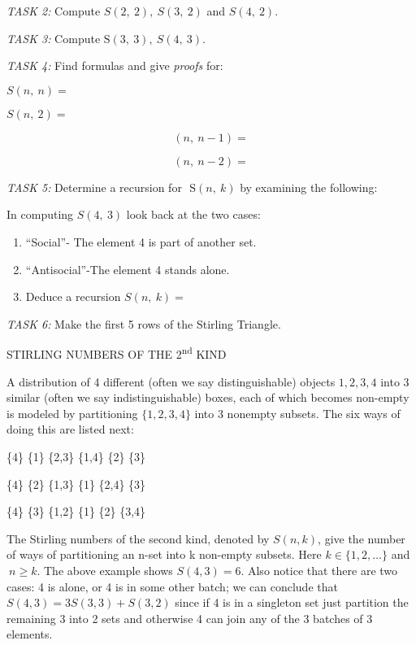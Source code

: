 \emph{TASK 2:} Compute \(S\left( 2,\ 2 \right),\ S(3,\ 2)\) and
\(S(4,\ 2)\).

\emph{TASK 3:} Compute\(\text{\ S}\left( 3,\ 3 \right),\ S(4,\ 3)\).

\emph{TASK 4:} Find formulas and give \emph{proofs} for:

\(S\left( n,\ n \right) =\)

\(S\left( n,\ 2 \right) =\)

\[
\left( n,\ n - 1 \right) =
\]

\[
\left( n,\ n - 2 \right) =
\]

\emph{TASK 5:} Determine a recursion for
\(\text{\ S}\left( n,\ k \right)\) by examining the following:

In computing \(S\left( 4,\ 3 \right)\) look back at the two cases:
\begin{enumerate}
\def\labelenumi{(\alph{enumi})}

\item
  ``Social''- The element 4 is part of another set.
\item
  ``Antisocial''-The element 4 stands alone.
\item
  Deduce a recursion \(S\left( n,\ k \right) =\)

\end{enumerate}

\emph{TASK 6:} Make the first 5 rows of the Stirling Triangle.

STIRLING NUMBERS OF THE 2\textsuperscript{nd} KIND

A distribution of 4 different (often we say distinguishable) objects
\(1,2,3,4\) into 3 similar (often we say indistinguishable) boxes, each
of which becomes non-empty is modeled by partitioning \(\{ 1,2,3,4\}\)
into 3 nonempty subsets. The six ways of doing this are listed next:

\{4\} \{1\} \{2,3\} \{1,4\} \{2\} \{3\}

\{4\} \{2\} \{1,3\} \{1\} \{2,4\} \{3\}

\{4\} \{3\} \{1,2\} \{1\} \{2\} \{3,4\}

The Stirling numbers of the second kind, denoted by \(S(n,k)\), give the
number of ways of partitioning an n-set into k non-empty subsets. Here
\(k \in \{ 1,2,\ldots\}\) and\(\ n \geq k\). The above example shows
\(S\left( 4,3 \right) = 6\). Also notice that there are two cases: 4 is
alone, or 4 is in some other batch; we can conclude that
\(S\left( 4,3 \right) = 3S\left( 3,3 \right) + S(3,2)\) since if 4 is in
a singleton set just partition the remaining 3 into 2 sets and otherwise
4 can join any of the 3 batches of 3 elements.

